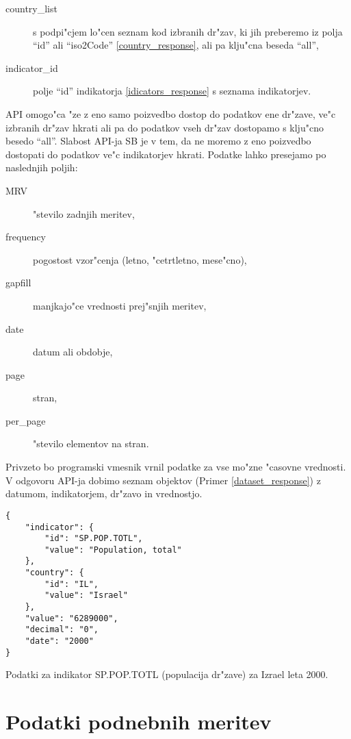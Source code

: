 \begin{description}
\item [country\_list] s podpi"cjem lo"cen seznam kod izbranih dr"zav, ki jih 
	  preberemo iz polja ``id'' ali ``iso2Code'' \ref{country_response}, ali pa 
      klju"cna beseda ``all'',
\item [indicator\_id] polje ``id'' indikatorja \ref{idicators_response} s seznama
      indikatorjev.
\end{description}

API omogo"ca "ze z eno samo poizvedbo dostop do podatkov ene dr"zave, ve"c izbranih 
dr"zav hkrati ali pa do podatkov vseh dr"zav dostopamo s klju"cno besedo ``all''.
Slabost API-ja SB je v tem, da ne moremo z eno poizvedbo dostopati do podatkov
ve"c indikatorjev hkrati. Podatke lahko presejamo po naslednjih poljih:
\begin{description}  
\item [MRV] "stevilo zadnjih meritev,
\item [frequency] pogostost vzor"cenja (letno, "cetrtletno, mese"cno),
\item [gapfill] manjkajo"ce vrednosti prej"snjih meritev,
\item [date] datum ali obdobje,
\item [page] stran,
\item [per\_page] "stevilo elementov na stran.
\end{description}

Privzeto bo programski vmesnik vrnil podatke za vse mo"zne "casovne 
vrednosti. V odgovoru API-ja dobimo seznam objektov (Primer
\ref{dataset_response}) z datumom, indikatorjem, dr"zavo in vrednostjo.


\begin{snippet}
\begin{center}
\begin{lstlisting}
{
    "indicator": {
        "id": "SP.POP.TOTL",
        "value": "Population, total"
    },
    "country": {
        "id": "IL",
        "value": "Israel"
    },
    "value": "6289000",
    "decimal": "0",
    "date": "2000"
}
\end{lstlisting}
\end{center}
\caption{Podatki za indikator SP.POP.TOTL (populacija dr"zave) za Izrael leta
2000.}
\label{dataset_response}
\end{snippet} 


\section{Podatki podnebnih meritev}

